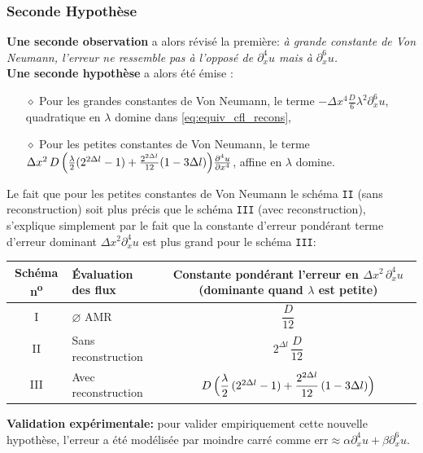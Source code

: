 \subsubsection{Seconde Hypothèse}
\textbf{Une seconde observation} a alors révisé la première: \textit{à grande constante de Von Neumann, l'erreur ne ressemble pas à l'opposé de $\partial_x^4 u$ mais à 
$\partial_x^6 u$.}\\
\textbf{Une seconde hypothèse} a alors été émise :
    \begin{itemize}
        \item[$\diamond$] Pour les grandes constantes de Von Neumann, le terme $- \Delta x^4 \frac{D}{6} \lambda^2 \partial_x^6 u$, quadratique en $\lambda$ domine dans \eqref{eq:equiv_cfl_recons},
        \item[$\diamond$] Pour les petites constantes de Von Neumann, le terme $\Delta x^{2}\, D \, \Bigl(\frac{\lambda}{2} (2^{2 \Delta l} - 1) + \frac{2^{2 \Delta l} }{12} (1 - 3 \Delta l)\Bigr)\frac{\partial^{4}u}{\partial x^{4}}$, affine en $\lambda$ domine.
    \end{itemize}
    Le fait que pour les petites constantes de Von Neumann le schéma \texttt{II} (sans reconstruction) soit plus précis que le schéma \texttt{III} (avec reconstruction),
    s'explique simplement par le fait que la constante d'erreur pondérant terme d'erreur dominant $\Delta x^2 \partial_x^4 u$ est plus grand pour le schéma \texttt{III}:
\begin{center}
    \renewcommand{\arraystretch}{1}
    \begin{tabular}{@{}clc@{}}
        \toprule
        \textbf{Schéma n\textsuperscript{o}} & \textbf{Évaluation des flux} &
        \makecell[c]{\textbf{Constante pondérant l'erreur en $\Delta x^{2}\,\partial_{x}^{4}u$}\\
                    \textbf{(dominante quand $\lambda$ est petite)}} \\
        \midrule
        I   & $\varnothing$ AMR          & $\dfrac{D}{12}$ \\[1mm]
        II  & Sans reconstruction         & $2^{\Delta l}\,\dfrac{D}{12}$ \\[1mm]
        III & Avec reconstruction         &
            $D\,\Bigl(\dfrac{\lambda}{2}\,(2^{2\Delta l}-1)
            + \dfrac{2^{2\Delta l}}{12}\,(1-3\Delta l)\Bigr)$ \\[1mm]
        \bottomrule
    \end{tabular}
\end{center}
\textbf{Validation expérimentale: } pour valider empiriquement cette nouvelle hypothèse, l'erreur a été modélisée par moindre carré comme $\text{err} \approx \alpha \partial_x^4 u + \beta \partial_x^6u$. 
